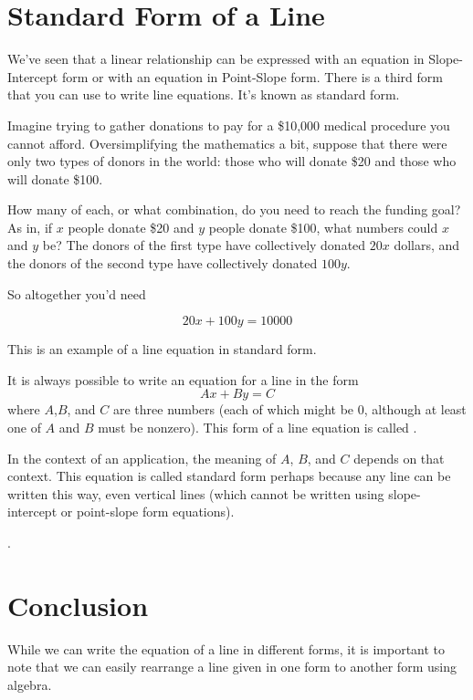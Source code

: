 \documentclass[nooutcomes]{ximera}
\begin{document}
\section{Standard Form of a Line}

We've seen that a linear relationship can be expressed with an equation in Slope-Intercept form or with an equation in Point-Slope form. There is a third form that you can use to write line equations. It's known as standard form.

Imagine trying to gather donations to pay for a \$10,000 medical procedure you cannot afford. Oversimplifying the mathematics a bit, suppose that there were only two types of donors in the world: those who will donate \$20 and those who will donate \$100.

How many of each, or what combination, do you need to reach the funding goal? As in, if $x$ people donate \$20 and $y$ people donate \$100, what numbers could $x$ and $y$ be? The donors of the first type have collectively donated $20x$ dollars, and the donors of the second type have collectively donated $100y$.  

So altogether you'd need

$$20x+100y=10000$$

This is an example of a line equation in standard form.


\begin{definition}
 It is always possible to write an equation for a line in the form
$$Ax+By=C$$
where $A$,$B$, and $C$ are three numbers (each of which might be 0, although at least one of $A$ and $B$ must be nonzero). This form of a line equation is called . 
\end{definition}


In the context of an application, the meaning of $A$, $B$,  and $C$ depends on that context. This equation is called standard form perhaps because any line can be written this way, even vertical lines (which cannot be written using slope-intercept or point-slope form equations).


.

\section{Conclusion}
While we can write the equation of a line in different forms, it is important to note that we can easily rearrange a line given in one form to another form using algebra.
\end{document}
